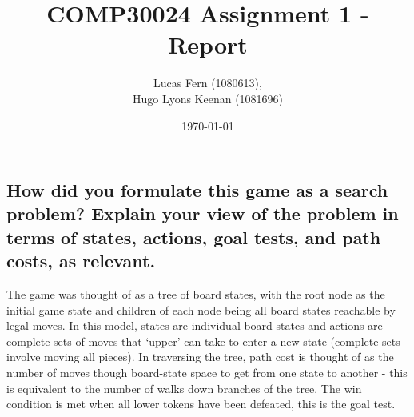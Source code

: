 \documentclass{article}
\title{COMP30024 Assignment 1 - Report}
\date{\today}
\author{Lucas Fern (1080613),\\Hugo Lyons Keenan (1081696)}
\begin{document}
\maketitle
\subsection*{How did you formulate this game as a search problem? Explain your view of the problem in terms of states, actions, goal tests, and path costs, as relevant.}
The game was thought of as a tree of board states, with the root node as the initial game state and children of each node being all board states reachable by legal moves. In this model, states are individual board states and actions are complete sets of moves that ‘upper’ can take to enter a new state (complete sets involve moving all pieces). In traversing the tree, path cost is thought of as the number of moves though board-state space to get from one state to another - this is equivalent to the number of walks down branches of the tree. The win condition is met when all lower tokens have been defeated, this is the goal test. 
\end{document}
